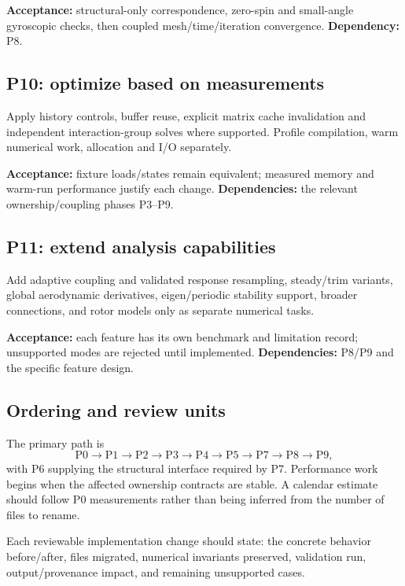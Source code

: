 \documentclass[11pt,a4paper]{article}
\begin{document}
\textbf{Acceptance:} structural-only correspondence, zero-spin and small-angle
gyroscopic checks, then coupled mesh/time/iteration convergence.
\textbf{Dependency:} P8.

\subsection{P10: optimize based on measurements}

Apply history controls, buffer reuse, explicit matrix cache invalidation and
independent interaction-group solves where supported. Profile compilation,
warm numerical work, allocation and I/O separately.

\textbf{Acceptance:} fixture loads/states remain equivalent; measured memory
and warm-run performance justify each change.
\textbf{Dependencies:} the relevant ownership/coupling phases P3--P9.

\subsection{P11: extend analysis capabilities}

Add adaptive coupling and validated response resampling, steady/trim variants,
global aerodynamic derivatives, eigen/periodic stability support, broader
connections, and rotor models only as separate numerical tasks.

\textbf{Acceptance:} each feature has its own benchmark and limitation record;
unsupported modes are rejected until implemented.
\textbf{Dependencies:} P8/P9 and the specific feature design.

\subsection{Ordering and review units}

The primary path is
\begin{equation*}
 \mathrm{P0}\to\mathrm{P1}\to\mathrm{P2}\to\mathrm{P3}\to
 \mathrm{P4}\to\mathrm{P5}\to\mathrm{P7}\to\mathrm{P8}\to\mathrm{P9},
\end{equation*}
with P6 supplying the structural interface required by P7. Performance work
begins when the affected ownership contracts are stable. A calendar estimate
should follow P0 measurements rather than being inferred from the number of
files to rename.

Each reviewable implementation change should state: the concrete behavior
before/after, files migrated, numerical invariants preserved, validation run,
output/provenance impact, and remaining unsupported cases.
\end{document}
